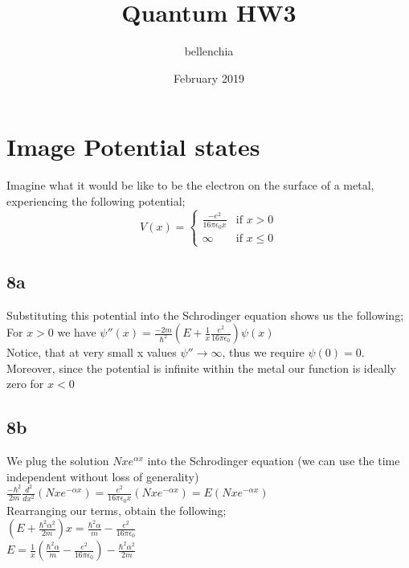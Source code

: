 \documentclass{article}
\title{Quantum HW3}
\author{bellenchia}
\date{February 2019}
\begin{document}
\maketitle
\section*{Image Potential states}
Imagine what it would be like to be the electron on the surface of a metal, experiencing the following potential;
\[
  V(x) =
  \begin{cases}
    \frac{-e^2}{16\pi\epsilon_0x}  & \text{if $x>0$} \\
  \infty & \text{if $x\leq0$}
  \end{cases}
\]
\subsection*{8a}

Substituting this potential into the Schrodinger equation  shows us the following;\\

For $x>0$ we have $\psi''(x)=\frac{-2m}{\hbar^2}(E+\frac{1}{x}\frac{e^2}{16\pi\epsilon_0})\psi(x)$\\

Notice, that at very small x values $\psi''\rightarrow\infty$, thus we require $\psi(0)=0$. Moreover, since the potential is infinite within the metal our function is ideally zero for $x<0$\\

\subsection*{8b}

We plug the solution $Nxe^{\alpha x}$ into the Schrodinger equation (we can use the time independent without loss of generality)\\

$\frac{-\hbar^2}{2m}\frac{d^2}{dx^2}(Nxe^{-\alpha x})=\frac{e^2}{16\pi\epsilon_0x}(Nxe^{-\alpha x})=E(Nxe^{-\alpha x})$\\

Rearranging our terms, obtain the following;\\

$(E+\frac{\hbar^2\alpha^2}{2m})x=\frac{\hbar^2\alpha}{m}-\frac{e^2}{16\pi\epsilon_0}$\\
$E=\frac{1}{x}(\frac{\hbar^2\alpha}{m}-\frac{e^2}{16\pi\epsilon_0})-\frac{\hbar^2\alpha^2}{2m}$\\
\end{document}
